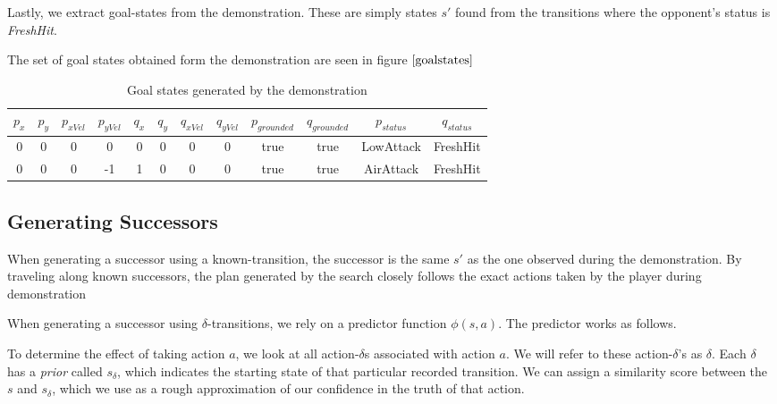 Lastly, we extract goal-states from the demonstration. These are simply states $s'$ found from the transitions where the opponent's status is \textit{FreshHit}. 

The set of goal states obtained form the demonstration are seen in figure $\ref{goalstates}$

\begin{table}[h]
	\centering
	\begin{tabular}{| c | c | c | c | c | c | c | c | c | c | c | c |}
		\hline
		$p_x$ & $p_y$ & $p_{xVel}$ & $p_{yVel}$ & $q_x$ & $q_y$ & $q_{xVel}$ & $q_{yVel}$ & $p_{grounded}$ & $q_{grounded}$ & $p_{status}$ & $q_{status}$\\
		\hline
		0 & 0 & 0 & 0 & 0 & 0 & 0 & 0 & true & true & LowAttack & FreshHit\\
		\hline
		0 & 0 & 0 & -1 & 1 & 0 & 0 & 0 & true & true & AirAttack & FreshHit\\
		\hline
	\end{tabular}
	\caption{Goal states generated by the demonstration}
	\label{goalstates}
\end{table}


\subsection{Generating Successors}

When generating a successor using a known-transition, the successor is the same $s'$ as the one observed during the demonstration. By traveling along known successors, the plan generated by the search closely follows the exact actions taken by the player during demonstration


When generating a successor using $\delta$-transitions, we rely on a predictor function $\phi(s,a)$. The predictor works as follows.

To determine the effect of taking action $a$, we look at all action-$\delta$s associated with action $a$. We will refer to these action-$\delta$'s as $\delta$. Each $\delta$ has a \textit{prior} called $s_{\delta}$, which indicates the starting state of that particular recorded transition. We can assign a similarity score between the $s$ and $s_{\delta}$, which we use as a rough approximation of our confidence in the truth of that action.

